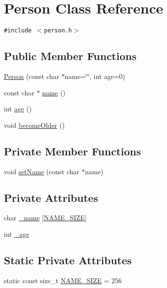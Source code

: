 \hypertarget{classPerson}{
\section{Person Class Reference}
\label{classPerson}
}
{\tt \#include $<$person.h$>$}

\subsection*{Public Member Functions}
\begin{CompactItemize}
\item 
\hyperlink{classPerson_45a51641d7fe85caee24d024f3f3df29}{Person} (const char $\ast$name=\char`\"{}\char`\"{}, int age=0)
\item 
const char $\ast$ \hyperlink{classPerson_edf33c236854f05b4f44647b8d675c54}{name} ()
\item 
int \hyperlink{classPerson_0551c356924e036e4cf9f51626d8cbd5}{age} ()
\item 
void \hyperlink{classPerson_70130f5fc7ae5d0386f138d6f37443de}{becomeOlder} ()
\end{CompactItemize}
\subsection*{Private Member Functions}
\begin{CompactItemize}
\item 
void \hyperlink{classPerson_e5f18cb79ba4e817f83ba561c8862f80}{setName} (const char $\ast$name)
\end{CompactItemize}
\subsection*{Private Attributes}
\begin{CompactItemize}
\item 
char \hyperlink{classPerson_7786299e5d7e6fd26829a17408c86baa}{\_\-name} \mbox{[}\hyperlink{classPerson_1706118706f27dc1e7d7d9d3928d614e}{NAME\_\-SIZE}\mbox{]}
\item 
int \hyperlink{classPerson_a8b4383565d4f2419fd9dedd657e0422}{\_\-age}
\end{CompactItemize}
\subsection*{Static Private Attributes}
\begin{CompactItemize}
\item 
static const size\_\-t \hyperlink{classPerson_1706118706f27dc1e7d7d9d3928d614e}{NAME\_\-SIZE} = 256
\end{CompactItemize}


